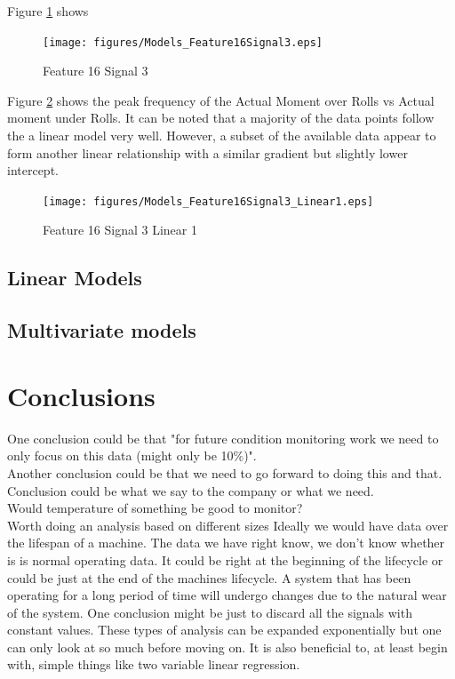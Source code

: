 \documentclass{article}
\begin{document}
Figure \ref{fig:Models_Feature16Signal3} shows 
\begin{figure}[H]
    \centering
    \texttt{[image: figures/Models\_Feature16Signal3.eps]}
    \caption{Feature 16 Signal 3}
    \label{fig:Models_Feature16Signal3}
\end{figure}

Figure \ref{fig:Models_Feature16Signal3_Linear1} shows the peak frequency of the Actual Moment over Rolls vs Actual moment under Rolls. It can be noted that a majority of the data points follow the a linear model very well. However, a subset of the available data appear to form another linear relationship with a similar gradient but slightly lower intercept.
\begin{figure}[H]
    \centering
    \texttt{[image: figures/Models\_Feature16Signal3\_Linear1.eps]}
    \caption{Feature 16 Signal 3 Linear 1}
    \label{fig:Models_Feature16Signal3_Linear1}
\end{figure}

\subsection{Linear Models}

\subsection{Multivariate models}

\clearpage 
\section{Conclusions}
One conclusion could be that "for future condition monitoring work we need to only focus on this data (might only be 10\%)".\\
Another conclusion could be that we need to go forward to doing this and that.\\
Conclusion could be what we say to the company or what we need.\\
Would temperature of something be good to monitor?\\
Worth doing an analysis based on different sizes
Ideally we would have data over the lifespan of a machine. The data we have right know, we don't know whether is is normal operating data. It could be right at the beginning of the lifecycle or could be just at the end of the machines lifecycle. A system that has been operating for a long period of time will undergo changes due to the natural wear of the system.
One conclusion might be just to discard all the signals with constant values.
These types of analysis can be expanded exponentially but one can only look at so much before moving on. It is also beneficial to, at least begin with, simple things like two variable linear regression.
\newpage
\end{document}
